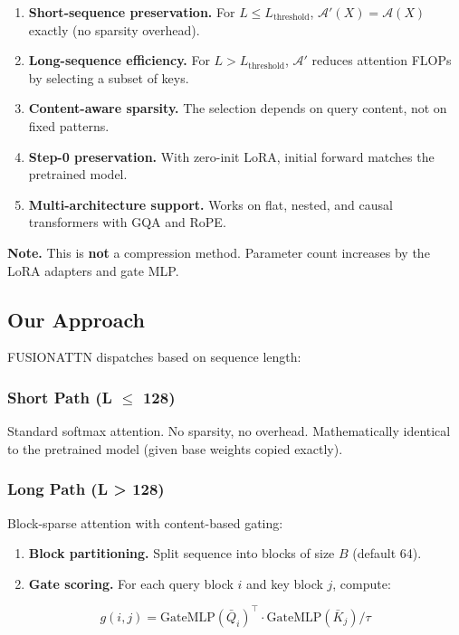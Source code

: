 \begin{enumerate}
\item \textbf{Short-sequence preservation.} For $L \leq L_\text{threshold}$,
  $\mathcal{A}'(X) = \mathcal{A}(X)$ exactly (no sparsity overhead).
\item \textbf{Long-sequence efficiency.} For $L > L_\text{threshold}$,
  $\mathcal{A}'$ reduces attention FLOPs by selecting a subset of keys.
\item \textbf{Content-aware sparsity.} The selection depends on query content, not
  on fixed patterns.
\item \textbf{Step-0 preservation.} With zero-init LoRA, initial forward matches
  the pretrained model.
\item \textbf{Multi-architecture support.} Works on flat, nested, and causal
  transformers with GQA and RoPE.

\end{enumerate}
\textbf{Note.} This is \textbf{not} a compression method. Parameter count increases 
by the LoRA adapters and gate MLP.

\subsection{Our Approach}

FUSIONATTN dispatches based on sequence length:

\subsubsection{Short Path (L $\le$ 128)}

Standard softmax attention. No sparsity, no overhead. Mathematically 
identical to the pretrained model (given base weights copied exactly).

\subsubsection{Long Path (L > 128)}

Block-sparse attention with content-based gating:

\begin{enumerate}
\item \textbf{Block partitioning.} Split sequence into blocks of size $B$ (default
  64).
\item \textbf{Gate scoring.} For each query block $i$ and key block $j$, compute:

\end{enumerate}
\[
g(i, j) = \text{GateMLP}(\bar{Q}_i)^\top \cdot \text{GateMLP}(\bar{K}_j) / \tau
\tag{1.2}
\]


